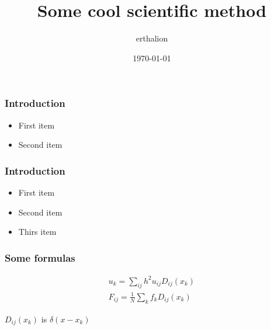 \documentclass[14pt]{beamer}
\title{Some cool scientific method}
\date{\today}
\author{erthalion}
\institute{Your University \\
    \vspace{0.7cm}
    \vspace{0.7cm}
}
\begin{document}
\maketitle

\begin{frame}
\frametitle{Introduction}
\begin{itemize}
	\item First item
	\item Second item
\end{itemize}
\end{frame}

\begin{frame}
\frametitle{Introduction}
\begin{itemize}
    \item \alert<+>{First item}
    \item \alert<+>{Second item}
    \item \alert<+>{Thirs item}
\end{itemize}
\end{frame}

\begin{frame}
\frametitle{Some formulas}
\begin{gather}
\label{eq:interpolation}
u_k = \sum_{ij}h^{2} u_{ij} D_{ij}(x_k) \\
\label{eq:spreading}
F_{ij} = \frac{1}{N} \sum_k f_k D_{ij}(x_k)
\end{gather}

$D_{ij}(x_k)$ is $\delta(x-x_k)$
\end{frame}
\end{document}
